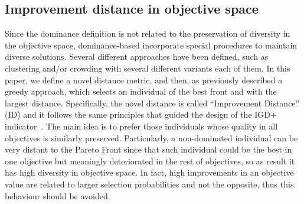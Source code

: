 \subsection{Improvement distance in objective space}

Since the dominance definition is not related to the preservation of diversity in the objective space,
dominance-based \MOEAS{} incorporate special procedures to maintain diverse solutions.
%
Several different approaches have been defined, such as clustering and/or crowding with several different 
variants each of them.
%
In this paper, we define a novel distance metric, and then, as previously described a greedy approach, which selects an individual of the best front and with the largest distance.
%
Specifically, the novel distance is called ``Improvement Distance'' (ID) and it 
follows the same principles that guided the design of the IGD+ indicator~\cite{Joel:Inverted_Generational_Distance_Plus}.
%
The main idea is to prefer those individuals whose quality in all objectives is similarly preserved.
%
Particularly, a non-dominated individual can be very distant to the Pareto Front since that such individual could be the best in one objective but meaningly deteriorated in the rest of objectives, so as result it has high diversity in objective space.
%
In fact, high improvements in an objective value are related to larger selection probabilities and not the opposite, thus this behaviour should be avoided.
%

